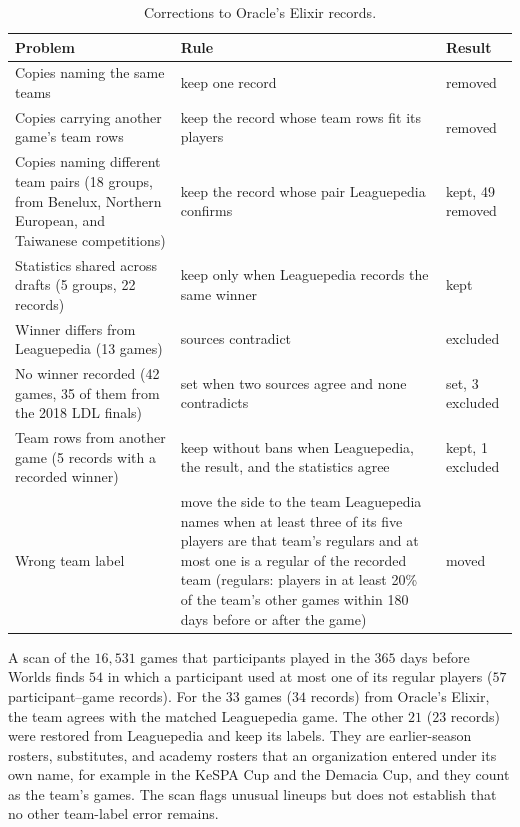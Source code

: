 \documentclass[11pt]{article}
\begin{document}
\begin{table}[h]
\centering
\small
\caption{Corrections to Oracle's Elixir records.}
\label{tab:corrections}
\begin{tabular}{>{\raggedright\arraybackslash}p{4.8cm}>{\raggedright\arraybackslash}p{6.9cm}>{\raggedright\arraybackslash}p{2.7cm}}
\toprule
Problem & Rule & Result \\
\midrule
Copies naming the same teams & keep one record & 41 removed \\
Copies carrying another game's team rows & keep the record whose team rows fit its players & 3 removed \\
Copies naming different team pairs (18 groups, from Benelux, Northern European, and Taiwanese competitions) & keep the record whose pair Leaguepedia confirms & 3 kept, 49 removed \\
Statistics shared across drafts (5 groups, 22 records) & keep only when Leaguepedia records the same winner & 6 kept \\
Winner differs from Leaguepedia (13 games) & sources contradict & 13 excluded \\
No winner recorded (42 games, 35 of them from the 2018 LDL finals) & set when two sources agree and none contradicts & 39 set, 3 excluded \\
Team rows from another game (5 records with a recorded winner) & keep without bans when Leaguepedia, the result, and the statistics agree & 4 kept, 1 excluded \\
Wrong team label & move the side to the team Leaguepedia names when at least three of its five players are that team's regulars and at most one is a regular of the recorded team (regulars: players in at least 20\% of the team's other games within 180 days before or after the game) & 5 moved \\
\bottomrule
\end{tabular}
\end{table}

A scan of the $16{,}531$ games that participants played in the $365$ days before Worlds finds $54$ in which a participant used at most one of its regular players ($57$ participant--game records). For the $33$ games ($34$ records) from Oracle's Elixir, the team agrees with the matched Leaguepedia game. The other $21$ ($23$ records) were restored from Leaguepedia and keep its labels. They are earlier-season rosters, substitutes, and academy rosters that an organization entered under its own name, for example in the KeSPA Cup and the Demacia Cup, and they count as the team's games. The scan flags unusual lineups but does not establish that no other team-label error remains.
\end{document}
